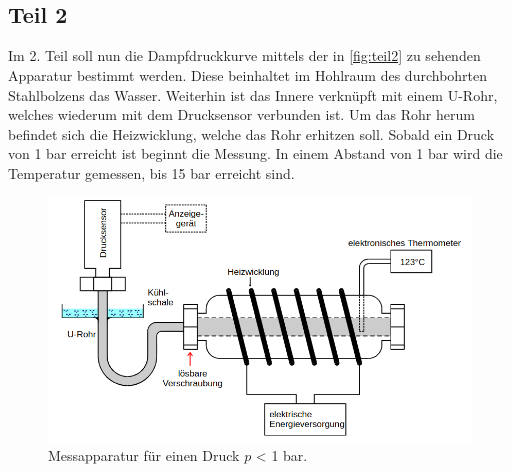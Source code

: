 \\
\\
\\
\\
\\
\\
\\
\\
\\
\\
\\
\\
\subsection{Teil 2}
Im 2. Teil soll nun die Dampfdruckkurve mittels der in \autoref{fig:teil2} zu 
sehenden Apparatur bestimmt werden. Diese beinhaltet im Hohlraum des durchbohrten 
Stahlbolzens das Wasser. Weiterhin ist das Innere verknüpft mit einem U-Rohr, 
welches wiederum mit dem Drucksensor verbunden ist. Um das Rohr herum befindet 
sich die Heizwicklung, welche das Rohr erhitzen soll. Sobald ein Druck von 1 bar 
erreicht ist beginnt die Messung. In einem Abstand von 1 bar wird die Temperatur 
gemessen, bis 15 bar erreicht sind.
\begin{figure}[h!]
    \centering
        \centering
        \includegraphics[width=\textwidth]{Bilder/teil2.png}
        \caption{Messapparatur für einen Druck $p$ < 1 bar. \cite{teil2}}
    \hfill
    \label{fig:teil2}
\end{figure}